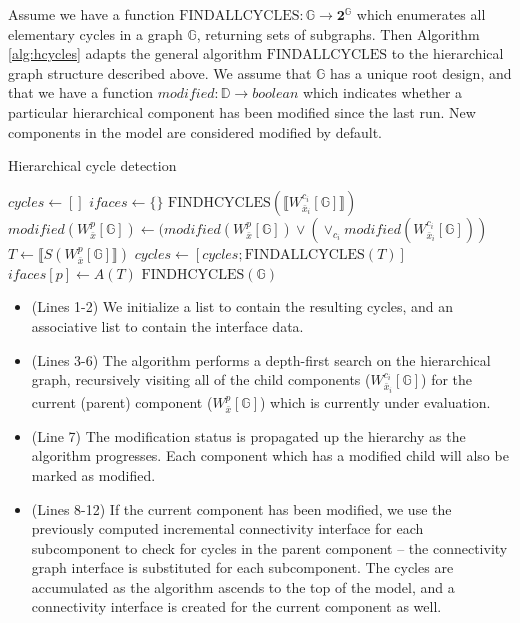 Assume we have a function 
${\scriptstyle \mathrm{FINDALLCYCLES}}: \mathbb{G} \rightarrow \mathbf{2}^{\mathbb{G}}$
which enumerates all elementary cycles in a graph $\mathbb{G}$, 
returning sets of subgraphs.  Then Algorithm \ref{alg:hcycles} 
adapts the general algorithm
${\scriptstyle \mathrm{FINDALLCYCLES}}$ to the hierarchical graph 
structure described above.  We 
assume that $\mathbb{G}$ has a unique root design, and that we have a 
function $modified: \mathbb{D} \rightarrow boolean$ which indicates whether
a particular hierarchical component has been modified since the last run.
New components in the model are considered modified by default.

\begin{algorithm}[H]
\caption{Hierarchical cycle detection}
\label{alg:hcycles}
\begin{algorithmic}[1]
\State $cycles \gets [ ]$
\State $ifaces \gets \{ \}$
      \State ${\scriptstyle \mathrm{FINDHCYCLES}}( \llbracket W_{\bar{x}_i}^{c_i} [\mathbb{G}] \rrbracket )$
   \EndFor
   \State $modified( W_{\bar{x}}^p [\mathbb{G}]) \gets (modified( W_{\bar{x}}^p [\mathbb{G}]) \vee ( \vee_{c_i} modified( W_{\bar{x}_i}^{c_i} [\mathbb{G}] ) )$
      \State $T \gets \llbracket S(W_{\bar{x}}^p [\mathbb{G}] \rrbracket )$
      \State $cycles \gets [ cycles; {\scriptstyle \mathrm{FINDALLCYCLES}}( T ) ]$
      \State $ifaces[p] \gets A(T)$
   \EndIf
\EndFunction
\State ${\scriptstyle \mathrm{FINDHCYCLES}}( \mathbb{G}) $
\end{algorithmic}
\end{algorithm}


\begin{itemize}
\item (Lines 1-2) We initialize a list to contain the resulting cycles, and an associative list to contain the interface data.
\item (Lines 3-6) The algorithm performs a depth-first search on the hierarchical graph, recursively visiting all of the child components ($W_{\bar{x}_i}^{c_i} [\mathbb{G}]$)  for the current (parent) component ($W_{\bar{x}}^p [\mathbb{G}]$) which is currently under evaluation.
\item (Line 7)  The modification status is propagated up the hierarchy as the algorithm progresses.  Each component which has a modified child will also be marked as modified.
\item (Lines 8-12) If the current component has been modified, we use the previously computed incremental connectivity interface for each subcomponent to check for cycles in the parent component -- the connectivity graph interface is substituted for each subcomponent.  The cycles are accumulated as the algorithm ascends to the top of the model, and a connectivity interface is created for the current component as well.
\end{itemize}

